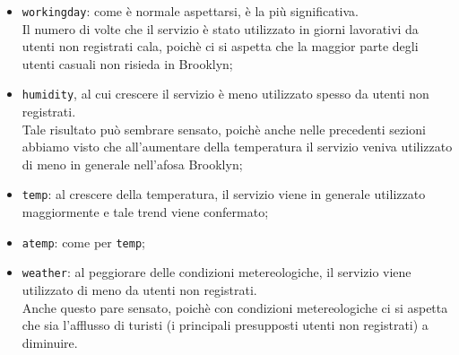 \begin{itemize}
\item \texttt{workingday}: come è normale aspettarsi, è la più significativa.\\
  Il numero di volte che il servizio è stato utilizzato in giorni lavorativi
  da utenti non registrati cala, poichè ci si aspetta che la maggior parte
  degli utenti casuali non risieda in Brooklyn;
\item \texttt{humidity}, al cui crescere il servizio è meno utilizzato spesso
  da utenti non registrati. \\
  Tale risultato può sembrare sensato, poichè anche nelle precedenti sezioni
  abbiamo visto che all'aumentare della temperatura il servizio veniva
  utilizzato di meno in generale nell'afosa Brooklyn;
\item \texttt{temp}: al crescere della temperatura, il servizio viene in
  generale utilizzato maggiormente e tale trend viene confermato;
\item \texttt{atemp}: come per \texttt{temp};
\item \texttt{weather}: al peggiorare delle condizioni metereologiche, il
  servizio viene utilizzato di meno da utenti non registrati. \\
  Anche questo pare sensato, poichè con condizioni metereologiche ci si
  aspetta che sia l'afflusso di turisti (i principali presupposti utenti non
  registrati) a diminuire.
\end{itemize}

